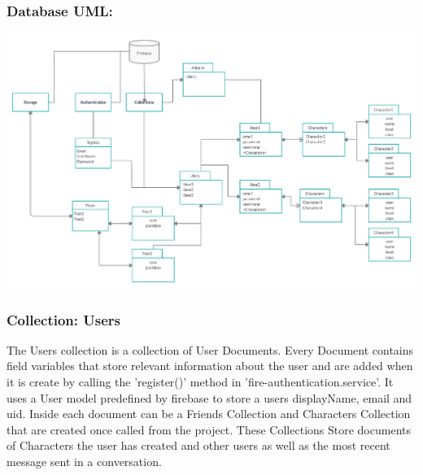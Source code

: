 \subsubsection{Database UML:}
\includegraphics[scale=0.1]{./img/FirebaseUML.png}

\subsubsection{Collection: Users}
The Users collection is a collection of User Documents. Every Document contains field variables that store relevant information about the user and are added when it is create by calling the 'register()' method in  'fire-authentication.service'. It uses a User model predefined by firebase to store a users displayName, email and uid. Inside each document can be a Friends Collection and Characters Collection that are created once called from the project. These Collections Store documents of Characters the user has created and other users as well as the most recent message sent in a conversation.
